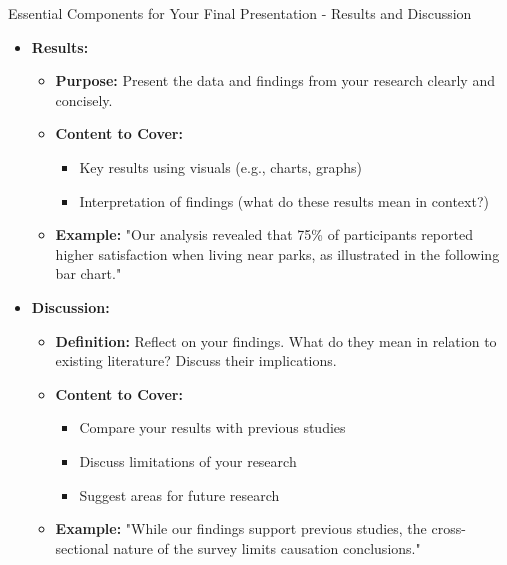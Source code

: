 \documentclass[aspectratio=169]{beamer}
\begin{document}
\begin{frame}[fragile]{Essential Components for Your Final Presentation - Results and Discussion}
    \begin{itemize}
        \item \textbf{Results:}
        \begin{itemize}
            \item \textbf{Purpose:} Present the data and findings from your research clearly and concisely.
            \item \textbf{Content to Cover:}
            \begin{itemize}
                \item Key results using visuals (e.g., charts, graphs)
                \item Interpretation of findings (what do these results mean in context?)
            \end{itemize}
            \item \textbf{Example:} "Our analysis revealed that 75\% of participants reported higher satisfaction when living near parks, as illustrated in the following bar chart."
        \end{itemize}

        \item \textbf{Discussion:}
        \begin{itemize}
            \item \textbf{Definition:} Reflect on your findings. What do they mean in relation to existing literature? Discuss their implications.
            \item \textbf{Content to Cover:}
            \begin{itemize}
                \item Compare your results with previous studies
                \item Discuss limitations of your research
                \item Suggest areas for future research
            \end{itemize}
            \item \textbf{Example:} "While our findings support previous studies, the cross-sectional nature of the survey limits causation conclusions."
        \end{itemize}
    \end{itemize}
\end{frame}
\end{document}
